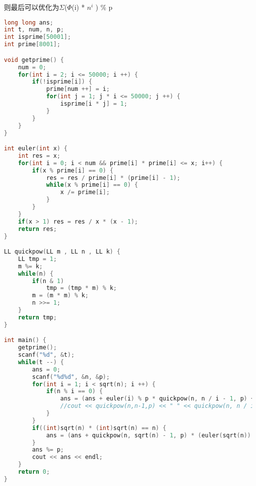 则最后可以优化为$\Sigma$($\Phi$(i) * $n^{i}$ ) \% p
    \begin{lstlisting}[language=c++]
long long ans;
int t, num, n, p;
int isprime[50001];
int prime[8001];

void getprime() {
    num = 0;
    for(int i = 2; i <= 50000; i ++) {
        if(!isprime[i]) {
            prime[num ++] = i;
            for(int j = 1; j * i <= 50000; j ++) {
                isprime[i * j] = 1;
            }
        }
    }
}

int euler(int x) {
    int res = x;
    for(int i = 0; i < num && prime[i] * prime[i] <= x; i++) {
        if(x % prime[i] == 0) {
            res = res / prime[i] * (prime[i] - 1);
            while(x % prime[i] == 0) {
                x /= prime[i];
            }
        }
    }
    if(x > 1) res = res / x * (x - 1);
    return res;
}

LL quickpow(LL m , LL n , LL k) {
    LL tmp = 1; 
    m %= k;
    while(n) { 
        if(n & 1)
            tmp = (tmp * m) % k; 
        m = (m * m) % k;
        n >>= 1;
    } 
    return tmp;
} 

int main() {
    getprime();
    scanf("%d", &t);
    while(t --) {
        ans = 0;
        scanf("%d%d", &n, &p);
        for(int i = 1; i < sqrt(n); i ++) {
            if(n % i == 0) {
                ans = (ans + euler(i) % p * quickpow(n, n / i - 1, p) + euler(n / i) % p * quickpow(n, i - 1, p)) % p;
                //cout << quickpow(n,n-1,p) << " " << quickpow(n, n / i - 1, p) << " " << euler(i) << " " << euler(n / i) << endl;
            }
        }
        if((int)sqrt(n) * (int)sqrt(n) == n) {
            ans = (ans + quickpow(n, sqrt(n) - 1, p) * (euler(sqrt(n)) % p)) % p;
        }
        ans %= p;
        cout << ans << endl;
    }
    return 0;
}
    \end{lstlisting}

